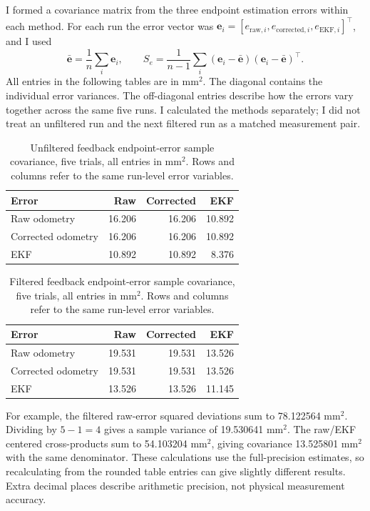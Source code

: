 I formed a covariance matrix from the three endpoint estimation errors within each method. For each run the error vector was $\mathbf e_i=[e_{\mathrm{raw},i},e_{\mathrm{corrected},i},e_{\mathrm{EKF},i}]^\top$, and I used
\[
\bar{\mathbf e}=\frac{1}{n}\sum_i\mathbf e_i,\qquad
S_e=\frac{1}{n-1}\sum_i(\mathbf e_i-\bar{\mathbf e})(\mathbf e_i-\bar{\mathbf e})^\top.
\]
All entries in the following tables are in mm$^2$. The diagonal contains the individual error variances. The off-diagonal entries describe how the errors vary together across the same five runs. I calculated the methods separately; I did not treat an unfiltered run and the next filtered run as a matched measurement pair.
\begin{table}[H]\centering
\begin{tabular}{lrrr}
\toprule
Error & Raw & Corrected & EKF\\\midrule
Raw odometry & 16.206 & 16.206 & 10.892\\
Corrected odometry & 16.206 & 16.206 & 10.892\\
EKF & 10.892 & 10.892 & 8.376\\
\bottomrule
\end{tabular}
\caption{Unfiltered feedback endpoint-error sample covariance, five trials, all entries in mm$^2$. Rows and columns refer to the same run-level error variables.}
\end{table}
\begin{table}[H]\centering
\begin{tabular}{lrrr}
\toprule
Error & Raw & Corrected & EKF\\\midrule
Raw odometry & 19.531 & 19.531 & 13.526\\
Corrected odometry & 19.531 & 19.531 & 13.526\\
EKF & 13.526 & 13.526 & 11.145\\
\bottomrule
\end{tabular}
\caption{Filtered feedback endpoint-error sample covariance, five trials, all entries in mm$^2$. Rows and columns refer to the same run-level error variables.}
\end{table}
For example, the filtered raw-error squared deviations sum to 78.122564 mm$^2$. Dividing by $5-1=4$ gives a sample variance of 19.530641 mm$^2$. The raw/EKF centered cross-products sum to 54.103204 mm$^2$, giving covariance 13.525801 mm$^2$ with the same denominator. These calculations use the full-precision estimates, so recalculating from the rounded table entries can give slightly different results. Extra decimal places describe arithmetic precision, not physical measurement accuracy.

